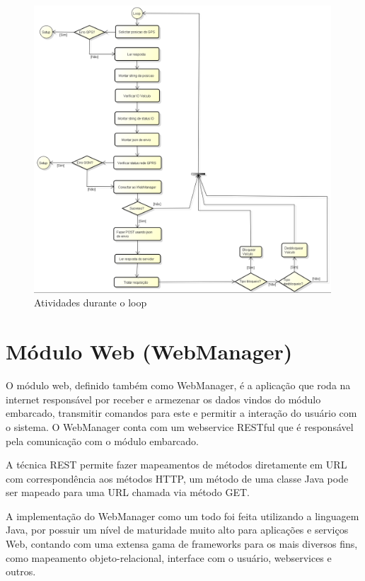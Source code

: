 \begin{figure}[!h]
	\centering
	\includegraphics[width=0.99\textwidth]{figures/ModuloVeicular_Loop.png}
	\caption{Atividades durante o loop}
	\label{1}
\end{figure}

\newpage

\section{Módulo Web (WebManager)}

O módulo web, definido também como WebManager, é a aplicação que roda na internet responsável por receber e armezenar os dados vindos do módulo embarcado, transmitir comandos para este e permitir a interação do usuário com o sistema. O WebManager conta com um webservice RESTful que é responsável pela comunicação com o módulo embarcado.

A técnica REST permite fazer mapeamentos de métodos diretamente em URL com correspondência aos métodos HTTP, um método de uma classe Java pode ser mapeado para uma URL chamada via método GET.

A implementação do WebManager como um todo foi feita utilizando a linguagem Java, por possuir um nível de maturidade muito alto para aplicações e serviços Web, contando com uma extensa gama de frameworks para os mais diversos fins, como mapeamento objeto-relacional, interface com o usuário,  webservices e outros.

